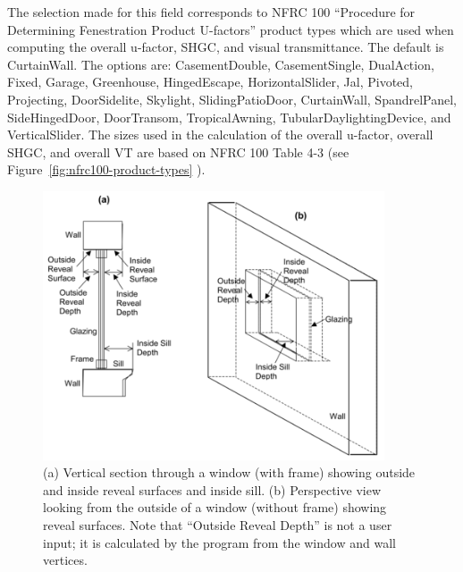 The selection made for this field corresponds to NFRC 100 ``Procedure for Determining Fenestration Product U-factors'' product types which are used when computing the overall u-factor, SHGC, and visual transmittance. The default is CurtainWall. The options are: CasementDouble, CasementSingle, DualAction, Fixed, Garage, Greenhouse, HingedEscape, HorizontalSlider, Jal, Pivoted, Projecting, DoorSidelite, Skylight, SlidingPatioDoor, CurtainWall, SpandrelPanel, SideHingedDoor, DoorTransom, TropicalAwning, TubularDaylightingDevice, and VerticalSlider. The sizes used in the calculation of the overall u-factor, overall SHGC, and overall VT are based on NFRC 100 Table 4-3 (see Figure~\ref{fig:nfrc100-product-types} ). 


\begin{figure}[hbtp] %
\centering
\includegraphics[width=0.9\textwidth, height=0.9\textheight, keepaspectratio=true]{media/image064.png}
\caption{(a) Vertical section through a window (with frame) showing outside and inside reveal surfaces and inside sill. (b) Perspective view looking from the outside of a window (without frame) showing reveal surfaces. Note that “Outside Reveal Depth” is not a user input; it is calculated by the program from the window and wall vertices. \protect \label{fig:a-vertical-section-through-a-window-with}}
\end{figure}

